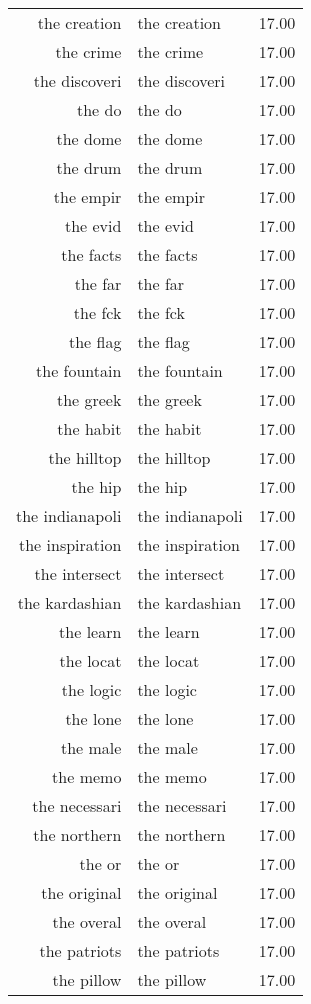 \begin{table}[ht]
\begin{tabular}{rlr}
  the creation & the creation & 17.00 \\ 
  the crime & the crime & 17.00 \\ 
  the discoveri & the discoveri & 17.00 \\ 
  the do & the do & 17.00 \\ 
  the dome & the dome & 17.00 \\ 
  the drum & the drum & 17.00 \\ 
  the empir & the empir & 17.00 \\ 
  the evid & the evid & 17.00 \\ 
  the facts & the facts & 17.00 \\ 
  the far & the far & 17.00 \\ 
  the fck & the fck & 17.00 \\ 
  the flag & the flag & 17.00 \\ 
  the fountain & the fountain & 17.00 \\ 
  the greek & the greek & 17.00 \\ 
  the habit & the habit & 17.00 \\ 
  the hilltop & the hilltop & 17.00 \\ 
  the hip & the hip & 17.00 \\ 
  the indianapoli & the indianapoli & 17.00 \\ 
  the inspiration & the inspiration & 17.00 \\ 
  the intersect & the intersect & 17.00 \\ 
  the kardashian & the kardashian & 17.00 \\ 
  the learn & the learn & 17.00 \\ 
  the locat & the locat & 17.00 \\ 
  the logic & the logic & 17.00 \\ 
  the lone & the lone & 17.00 \\ 
  the male & the male & 17.00 \\ 
  the memo & the memo & 17.00 \\ 
  the necessari & the necessari & 17.00 \\ 
  the northern & the northern & 17.00 \\ 
  the or & the or & 17.00 \\ 
  the original & the original & 17.00 \\ 
  the overal & the overal & 17.00 \\ 
  the patriots & the patriots & 17.00 \\ 
  the pillow & the pillow & 17.00 \\ 

\end{tabular}
\end{table}
